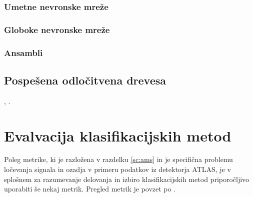 \documentclass[11pt,a4paper,openany]{book}
\begin{document}
\subsubsection{Umetne nevronske mreže}

\subsubsection{Globoke nevronske mreže}

\subsubsection{Ansambli}

\subsection{Pospešena odločitvena drevesa}

\cite{chen2014}, \cite{chenG16}.

\section{Evalvacija klasifikacijskih metod}

Poleg metrike, ki je razložena v razdelku \ref{sc:ams} in je specifična problemu ločevanja signala in ozadja v primeru podatkov iz detektorja ATLAS, je v splošnem za razumevanje delovanja in izbiro klasifikacijskih metod priporočljivo uporabiti še nekaj metrik. Pregled metrik je povzet po \cite{wiki:precision_and_recall}.
\end{document}
